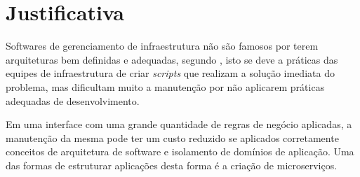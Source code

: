 \section{Justificativa}

  Softwares de gerenciamento de infraestrutura não são famosos por terem
  arquiteturas bem definidas e adequadas, segundo \cite{Tobin2006}, isto
  se deve a práticas das equipes de infraestrutura de criar \textit{scripts}
  que realizam a solução imediata do problema, mas dificultam muito a
  manutenção por não aplicarem práticas adequadas de desenvolvimento.

  Em uma interface com uma grande quantidade de regras de negócio aplicadas,
  a manutenção da mesma pode ter um custo reduzido se aplicados corretamente
  conceitos de arquitetura de software e isolamento de domínios de aplicação.
  Uma das formas de estruturar aplicações desta forma é a criação de
  microserviços.

